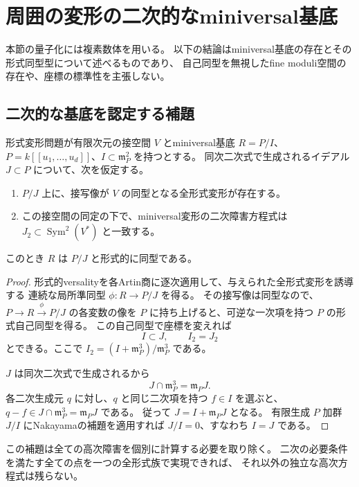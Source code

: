 \section{周囲の変形の二次的なminiversal基底}
\label{sec:quadratic-hull-v31}

本節の量子化には複素数体を用いる。
以下の結論はminiversal基底の存在とその形式同型型について述べるものであり、
自己同型を無視したfine moduli空間の存在や、座標の標準性を主張しない。

\subsection{二次的な基底を認定する補題}

\begin{lemma}[二次生成と量子化族による認定]
\label{lem:quadratic-hull-recognition-v31}
形式変形問題が有限次元の接空間 $V$ とminiversal基底
$R=P/I$、$P=k[[u_1,\ldots,u_d]]$、$I\subset\mathfrak m_P^2$ を持つとする。
同次二次式で生成されるイデアル $J\subset P$ について、次を仮定する。
\begin{enumerate}
\item $P/J$ 上に、接写像が $V$ の同型となる全形式変形が存在する。
\item この接空間の同定の下で、miniversal変形の二次障害方程式は
      $J_2\subset\operatorname{Sym}^2(V^*)$ と一致する。
\end{enumerate}
このとき $R$ は $P/J$ と形式的に同型である。
\end{lemma}

\begin{proof}
形式的versalityを各Artin商に逐次適用して、与えられた全形式変形を誘導する
連続な局所準同型 $\phi:R\longrightarrow P/J$ を得る。
その接写像は同型なので、$P\to R\xrightarrow{\phi}P/J$ の各変数の像を
$P$ に持ち上げると、可逆な一次項を持つ $P$ の形式自己同型を得る。
この自己同型で座標を変えれば
\[
 I\subset J,\qquad I_2=J_2
\]
とできる。ここで $I_2=(I+\mathfrak m_P^3)/\mathfrak m_P^3$ である。

$J$ は同次二次式で生成されるから
\[
 J\cap\mathfrak m_P^3=\mathfrak m_PJ.
\]
各二次生成元 $q$ に対し、$q$ と同じ二次項を持つ $f\in I$ を選ぶと、
$q-f\in J\cap\mathfrak m_P^3=\mathfrak m_PJ$ である。
従って $J=I+\mathfrak m_PJ$ となる。
有限生成 $P$ 加群 $J/I$ にNakayamaの補題を適用すれば $J/I=0$、すなわち $I=J$ である。
\end{proof}

この補題は全ての高次障害を個別に計算する必要を取り除く。
二次の必要条件を満たす全ての点を一つの全形式族で実現できれば、
それ以外の独立な高次方程式は残らない。


